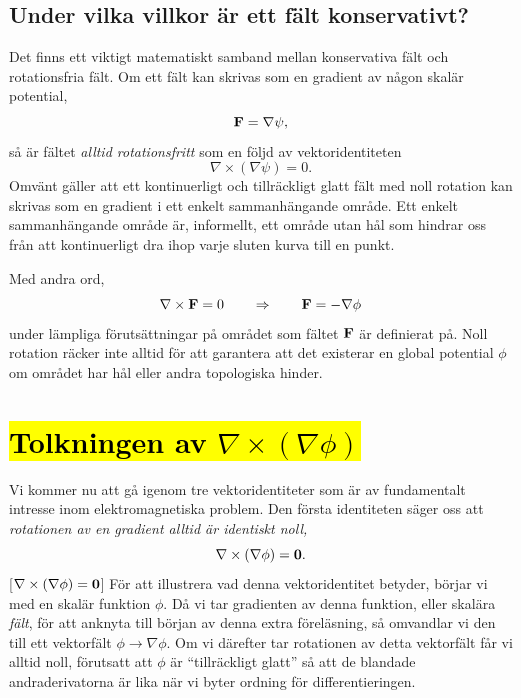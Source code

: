 \subsection{Under vilka villkor {\"a}r ett f{\"a}lt konservativt?}
Det finns ett viktigt matematiskt samband mellan konservativa f{\"a}lt och
rotationsfria f{\"a}lt. Om ett f{\"a}lt kan skrivas som en gradient av
n{\aa}gon skal{\"a}r potential,
$$
  {\bf F}=\nabla\psi,
$$
s{\aa} {\"a}r f{\"a}ltet {\it alltid rotationsfritt} som en f{\"o}ljd av
vektoridentiteten
$$
  \nabla\times(\nabla\psi)=0.
$$
Omv{\"a}nt g{\"a}ller att ett kontinuerligt och tillr{\"a}ckligt glatt f{\"a}lt
med noll rotation kan skrivas som en gradient i ett enkelt sammanh{\"a}ngande
omr{\aa}de. Ett enkelt sammanh{\"a}ngande omr{\aa}de {\"a}r, informellt, ett
omr{\aa}de utan h{\aa}l som hindrar oss fr{\aa}n att kontinuerligt dra ihop
varje sluten kurva till en punkt.

Med andra ord,
$$
  \nabla\times{\bf F}=0 \qquad\Rightarrow\qquad {\bf F}=-\nabla\phi
$$
under l{\"a}mpliga f{\"o}ruts{\"a}ttningar p{\aa} omr{\aa}det som f{\"a}ltet
${\bf F}$ {\"a}r definierat p{\aa}. Noll rotation r{\"a}cker inte alltid
f{\"o}r att garantera att det existerar en global potential $\phi$ om
omr{\aa}det har h{\aa}l eller andra topologiska hinder.

\section{{\hl{Tolkningen av $\nabla\times(\nabla\phi)$}}}
Vi kommer nu att g{\aa} igenom tre vektoridentiteter som {\"a}r av fundamentalt
intresse inom elektromagnetiska problem. Den f{\"o}rsta identiteten s{\"a}ger
oss att {\it rotationen av en gradient alltid {\"a}r identiskt noll,}
$$
  \nabla\times(\nabla\phi)={\bf 0}.
$$[$\nabla\times(\nabla\phi)={\bf 0}$]
F{\"o}r att illustrera vad denna vektoridentitet betyder, b{\"o}rjar vi med en
skal{\"a}r funktion $\phi$. D{\aa} vi tar gradienten av denna funktion, eller
skal{\"a}ra {\it f{\"a}lt}, f{\"o}r att anknyta till b{\"o}rjan av denna extra
f{\"o}rel{\"a}sning, s{\aa} omvandlar vi den till ett vektorf{\"a}lt
$\phi\rightarrow\nabla\phi$. Om vi d{\"a}refter tar rotationen av detta
vektorf{\"a}lt f{\aa}r vi alltid noll, f{\"o}rutsatt att $\phi$ {\"a}r
``tillr{\"a}ckligt glatt'' s{\aa} att de blandade andraderivatorna {\"a}r lika
n{\"a}r vi byter ordning f{\"o}r differentieringen.

